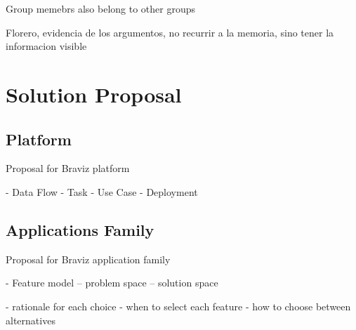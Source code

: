 Group memebrs also belong to other groups

Florero, evidencia de los argumentos, no recurrir a la memoria, sino tener la informacion visible









\section{Solution Proposal}


\subsection{Platform}

Proposal for Braviz platform

- Data Flow
- Task 
- Use Case
- Deployment


\subsection{Applications Family}

Proposal for Braviz application family

- Feature model
-- problem space
-- solution space

- rationale for each choice
- when to select each feature
- how to choose between alternatives
